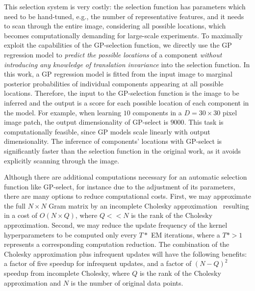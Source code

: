 \documentclass[12pt]{article}
\begin{document}
This selection system is very costly: the selection function has parameters which need to be hand-tuned, e.g., the number of representative features, and 
it needs to scan through the entire image, considering all possible locations, which becomes computationally demanding for large-scale experiments.
To maximally exploit the capabilities of the GP-selection function, we directly use the GP regression model to \textit{predict the possible locations} of a component \textit{without introducing any knowledge of translation invariance} into the selection function. In this work, a GP regression model is fitted from the input image to marginal posterior probabilities of individual components appearing at all possible locations. Therefore, the input to the GP-selection function is the image to be inferred and the output is a score for each possible location of each component in the model.
For example, when learning $10$ components in a $D=30\times 30$ pixel image patch, the output dimensionality of GP-select is $9000$.
This task is computationally feasible, since GP models scale linearly with output dimensionality.
The inference of components' locations with GP-select is significantly faster than the selection function in the original work, as it avoids explicitly scanning through the image.

Although there are additional computations necessary for an automatic selection function like GP-select, for instance due to the adjustment of its parameters,
there are many options to reduce computational costs.
First, we may approximate the full $N \times N$ Gram matrix by an incomplete Cholesky approximation~\citep{FinSch01} 
resulting in a cost of $O(N\times Q)$, where $Q << N$ is the rank of the Cholesky approximation.
Second, we may reduce the update frequency of the kernel hyperparameters to be computed only every $T\ast$ EM iterations, where a $T\ast > 1$ represents a corresponding computation reduction.
The combination of the Cholesky approximation plus infrequent updates will have the following benefits: a factor of five speedup for infrequent updates, and a factor of $(N-Q)^2$ speedup from incomplete Cholesky, where $Q$ is the rank of the Cholesky approximation and $N$ is the number of original data points. 
\end{document}
